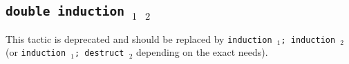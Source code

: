 \begin{coq_example*}
\begin{Variants}
\end{Variants}


\subsection{\tt double induction \ident$_1$ \ident$_2$}

This tactic is deprecated and should be replaced by {\tt induction \ident$_1$; induction \ident$_2$} (or {\tt induction \ident$_1$; destruct \ident$_2$} depending on the exact needs).






\end{coq_example*}
